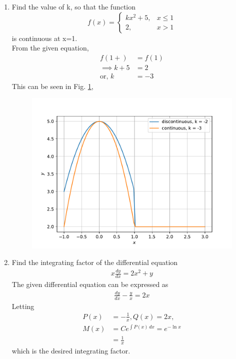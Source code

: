 \documentclass[journal,12pt,twocolumn]{IEEEtran}
\renewcommand\thesection{\arabic{section}}
\begin{document}
\begin{enumerate}[label=\thesection.\arabic*.,ref=\thesection.\theenumi]
\item  Find the value of k, so that the function 
	\begin{equation*}  f(x)  = \begin{cases}
                 k x^2 + 5,  & x \leq 1 \\
        2 , & x  >  1
\end{cases} \end{equation*} 
is continuous at x=1. \\
\solution  From the given equation, 
	\begin{align}  f(1+)  &= f(1)  
		\\
		\implies k+5 &= 2
		\\
		\text{or, } k &= -3
 \end{align} 
This can be seen in Fig. 
	\ref{fig:cont-12-14},
\begin{figure}[!ht]
	\centering
	\includegraphics[width=\columnwidth]{figs/cont-12-14.pdf}
	\caption{}
	\label{fig:cont-12-14}
\end{figure}
\item  Find the integrating factor of the differential equation 
	\begin{align} 
	 x\frac{dy}{dx} = 2x^2 +y 
	\end{align} 
	\solution  The given differential equation can be expressed as
	\begin{align} 
		\frac{dy}{dx} -\frac{y}{x} = 2x 
	\end{align} 
	Letting 
	\begin{align} 
		P(x) &= -\frac{1}{x}, Q(x) = 2x,
		\\
		M(x) &= Ce^{\int P(x)\,dx} = e^{-\ln x}
		\\
		&= \frac{1}{x}
	\end{align} 
	which is the desired integrating factor.


\end{enumerate}
\end{document}

